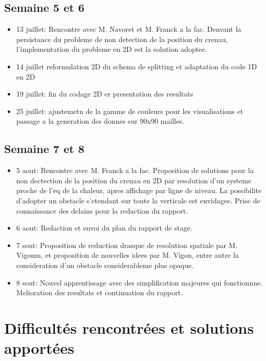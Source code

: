 \subsection{Semaine 5 et 6}

\begin{itemize}
 \item 13 juillet: Rencontre avec M. Navoret et M. Franck a la fac. Denvant la persistance du probleme de non detection de la position du crenau, l'implementation du probleme en 2D est la solution adoptee.
 \item 14 juillet reformulation 2D du schema de splitting et adaptation du code 1D en 2D
 \item 19 juillet: fin du codage 2D  er presentation des resultats
 \item 25 juillet: ajustemetn de la gamme de couleurs pour les visualisations et passage a la generation des donnes sur 90x90 mailles.
\end{itemize}

\subsection{Semaine 7 et 8}
\begin{itemize}
 \item 5 aout: Rencontre avec M. Franck a la fac. Proposition de solutions pour la non dectection de la position du crenau en 2D par resolution d'un systeme proche de l'eq de la chaleur, apres affichage par ligne de niveau. La possibilite d'adopter un obstacle s'etendant sur toute la verticale est envidagee. Prise de connaissance des delains pour la redaction du rapport.
 \item 6 aout: Redaction et envoi du plan du rapport de stage. 
 \item 7 sout: Proposition de reduction drasque de resolution spatiale par M. Vigonm, et proposition de nouvelles idees par M. Vigon, entre autre la consideration d'un obstacle considerableme plus opaque.
 \item 8 sout: Nouvel apprentissage avec des simplification majeures qui fonctionnne. Melioration des resultats et continuation du rapport.
\end{itemize}

\section{Difficultés rencontrées et solutions apportées}

